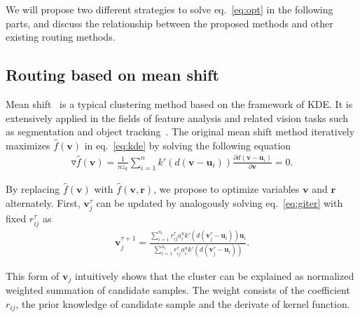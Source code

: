 \documentclass[runningheads]{llncs}
\begin{document}
We will propose two different strategies to solve eq.~\ref{eq:opt} in the following parts, and discuss the relationship between the proposed methods and other existing routing methods.

\subsection{Routing based on mean shift}
Mean shift~\cite{comaniciu2002mean} is a typical clustering method based on the framework of KDE. It is extensively applied in the fields of feature analysis and related vision tasks such as segmentation and object tracking~\cite{meanshift}. The original mean shift method iteratively maximizes $\hat{f}(\boldsymbol{v})$ in eq.~\ref{eq:kde} by solving the following equation
\begin{align}
\label{eq:giter}
\triangledown\hat{f}(\boldsymbol{v})=\frac{1}{nz_k}\sum\limits_{i=1}^nk'(d(\boldsymbol{v}-\boldsymbol{u}_i))\frac{\partial{d}(\boldsymbol{v}-\boldsymbol{u}_i)}{\partial{\boldsymbol{v}}}=0.
\end{align}

By replacing $\hat{f}(\boldsymbol{v})$ with $\hat{f}(\boldsymbol{v},\boldsymbol{r})$, we propose to optimize variables $\boldsymbol{v}$ and $\boldsymbol{r}$ alternately. First, $\boldsymbol{v}_j^{\tau}$ can be updated by analogously solving eq.~\ref{eq:giter} with fixed $r_{ij}^{\tau}$ as
\begin{align}
\label{eq:iterv}
\boldsymbol{v}_j^{\tau+1} = \frac{\sum\limits_{i=1}^{n_l}r_{ij}^{\tau}a_i^uk'(d(\boldsymbol{v}_j^{\tau}-\boldsymbol{u}_i))\boldsymbol{u}_i}{\sum\limits_{i=1}^{n_l}r_{ij}^{\tau}a_i^uk'(d(\boldsymbol{v}_j^{\tau}-\boldsymbol{u}_i))}.
\end{align}


This form of $\boldsymbol{v}_j$ intuitively shows that the cluster can be explained as normalized weighted summation of candidate samples. The weight consists of the coefficient $r_{ij}$, the prior knowledge of candidate sample and the derivate of kernel function. 
\end{document}
